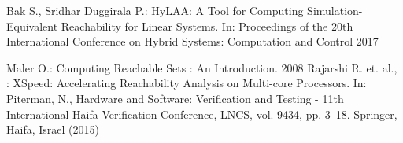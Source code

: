 \documentclass[runningheads]{llncs}
\begin{document}
%
%
%
% 
% 
%
\begin{thebibliography}{8}


Bak S., Sridhar Duggirala P.: HyLAA: A Tool for Computing Simulation-Equivalent Reachability for Linear Systems. In:
Proceedings of the 20th International Conference on Hybrid Systems: Computation and Control 2017

Maler O.: Computing Reachable Sets : An Introduction. 2008
Rajarshi R. et. al., : XSpeed: Accelerating Reachability Analysis on Multi-core Processors. In: Piterman, N., Hardware and Software: Verification and Testing - 11th International Haifa Verification Conference, LNCS, vol. 9434, pp. 3--18. Springer, Haifa, Israel (2015)

\end{thebibliography}
\end{document}
